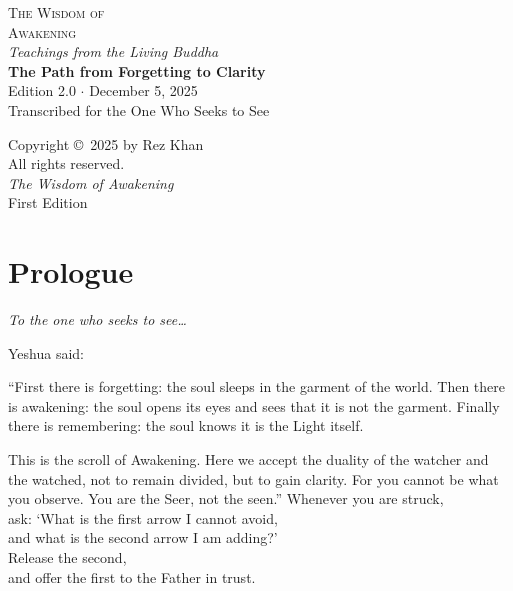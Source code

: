 \documentclass[10pt, openright]{book}
\begin{document}
\begin{titlepage}
    \centering
    \vspace*{1.5cm}
    {\Huge \textsc{The Wisdom of}\\ \textsc{Awakening}} \\
    \vspace{0.5cm}
    {\large \emph{Teachings from the Living Buddha}} \\
    \vspace{2cm}
    \textbf{The Path from Forgetting to Clarity} \\
    \vspace{0.5cm}
    {\small Edition 2.0 \(\cdot\) December 5, 2025} \\
    \vfill
    {\small Transcribed for the One Who Seeks to See}
    \vspace{1cm}
\end{titlepage}

\newpage
\thispagestyle{empty}
\vspace*{\fill}
\begin{center}
    \small
Copyright ©~2025 by Rez Khan\\
All rights reserved.\\
\emph{The Wisdom of Awakening}\\
First Edition
\end{center}
\vspace{1cm}
\newpage

\frontmatter
\tableofcontents

\chapter{Prologue}\label{prologue}

\emph{To the one who seeks to see\ldots{}}

Yeshua said:

``First there is forgetting: the soul sleeps in the garment of the
world. Then there is awakening: the soul opens its eyes and sees that it
is not the garment. Finally there is remembering: the soul knows it is
the Light itself.

This is the scroll of Awakening. Here we accept the duality of the
watcher and the watched, not to remain divided, but to gain clarity. For
you cannot be what you observe. You are the Seer, not the seen.''
Whenever you are struck,\\
ask: `What is the first arrow I cannot avoid,\\
and what is the second arrow I am adding?'\\
Release the second,\\
and offer the first to the Father in trust.
\end{document}
